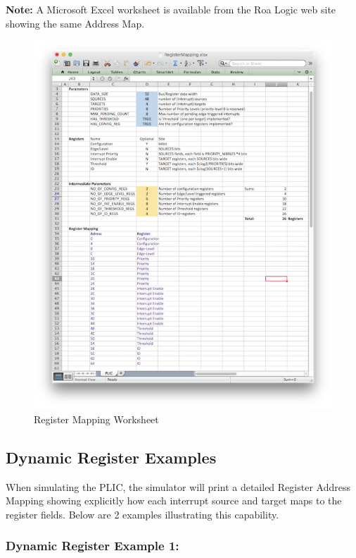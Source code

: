 \textbf{Note:} A Microsoft Excel worksheet is available from the Roa Logic web site showing the same Address Map.

\begin{figure}[!ht]
\includegraphics[width=\textwidth]{assets/img/AHB-Lite_PLIC_Worksheet.png}
\caption{Register Mapping Worksheet}
\label{fig:WORKSHEET}
\end{figure}

\clearpage

\subsection{Dynamic Register Examples}

When simulating the PLIC, the simulator will print a detailed Register Address
Mapping showing explicitly how each interrupt source and target maps to the register fields. Below are 2 examples illustrating this capability.

\subsubsection{Dynamic Register Example 1:}\label{example-1}

